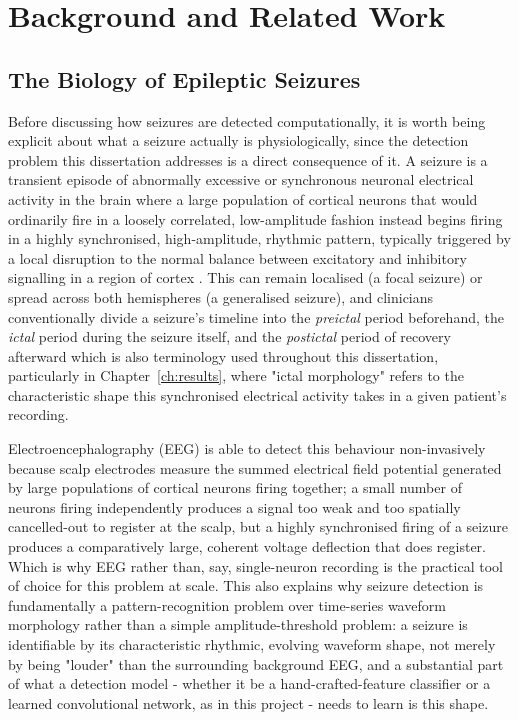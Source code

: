 \chapter{Background and Related Work}
\label{ch:background}

\section{The Biology of Epileptic Seizures}
\label{sec:biology}

Before discussing how seizures are detected computationally, it is worth being explicit about what a seizure actually is physiologically, since the detection problem this dissertation addresses is a direct consequence of it. A seizure is a transient episode of abnormally excessive or synchronous neuronal electrical activity in the brain where a large population of cortical neurons that would ordinarily fire in a loosely correlated, low-amplitude fashion instead begins firing in a highly synchronised, high-amplitude, rhythmic pattern, typically triggered by a local disruption to the normal balance between excitatory and inhibitory signalling in a region of cortex \citep{who2024epilepsy}. This can remain localised (a focal seizure) or spread across both hemispheres (a generalised seizure), and clinicians conventionally divide a seizure's timeline into the \emph{preictal} period beforehand, the \emph{ictal} period during the seizure itself, and the \emph{postictal} period of recovery afterward which is also terminology used throughout this dissertation, particularly in Chapter~\ref{ch:results}, where "ictal morphology" refers to the characteristic shape this synchronised electrical activity takes in a given patient's recording.

Electroencephalography (EEG) is able to detect this behaviour non-invasively because scalp electrodes measure the summed electrical field potential generated by large populations of cortical neurons firing together; a small number of neurons firing independently produces a signal too weak and too spatially cancelled-out to register at the scalp, but a highly synchronised firing of a seizure produces a comparatively large, coherent voltage deflection that does register. Which is why EEG rather than, say, single-neuron recording is the practical tool of choice for this problem at scale. This also explains why seizure detection is fundamentally a pattern-recognition problem over time-series waveform morphology rather than a simple amplitude-threshold problem: a seizure is identifiable by its characteristic rhythmic, evolving waveform shape, not merely by being "louder" than the surrounding background EEG, and a substantial part of what a detection model - whether it be a hand-crafted-feature classifier or a learned convolutional network, as in this project - needs to learn is this shape.

